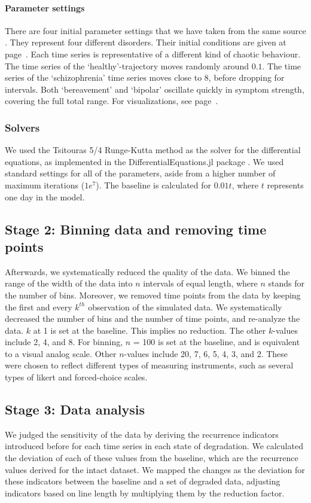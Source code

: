 \documentclass[utf8]{FrontiersinVancouver}
\begin{document}
\paragraph{Parameter settings}
There are four initial parameter settings that we have taken from the same source \citep{gauldDynamicalSystemsComputational2023}. They represent four different disorders. Their initial conditions are given at page~\pageref{tab:1}. Each time series is representative of a different kind of chaotic behaviour. The time series of the `healthy'-trajectory moves randomly around $0.1$. The time series of the `schizophrenia' time series moves close to 8, before dropping for intervals. Both `bereavement' and `bipolar' oscillate quickly in symptom strength, covering the full total range. For visualizations, see page~\pageref{fig:1}. 

\subsubsection{Solvers}
We used the Tsitouras 5/4 Runge-Kutta method as the solver for the differential equations, as implemented in the DifferentialEquations.jl package \citep{tsitourasRungeKuttaPairs2011}. We used standard settings for all of the parameters, aside from a higher number of maximum iterations ($1e^{7}$). The baseline is calculated for $0.01t$, where $t$ represents one day in the model. 

\subsection{Stage 2: Binning data and removing time points}
Afterwards, we systematically reduced the quality of the data. We binned the range of the width of the data into $n$ intervals of equal length, where $n$ stands for the number of bins. Moreover, we removed time points from the data by keeping the first and every $k^{th}$ observation of the simulated data.
We systematically decreased the number of bins and the number of time points, and re-analyze the data. $k$ at 1 is set at the baseline. This implies no reduction. The other $k$-values include 2, 4, and 8. For binning, $n$ = 100 is set at the baseline, and is equivalent to a visual analog scale. Other $n$-values include 20, 7, 6, 5, 4, 3, and 2. These were chosen to reflect different types of measuring instruments, such as several types of likert and forced-choice scales.

\subsection{Stage 3: Data analysis}
We judged the sensitivity of the data by deriving the recurrence indicators introduced before for each time series in each state of degradation. We calculated the deviation of each of these values from the baseline, which are the recurrence values derived for the intact dataset. We mapped the changes as the deviation for these indicators between the baseline and a set of degraded data, adjusting indicators based on line length by multiplying them by the reduction factor.
\end{document}
